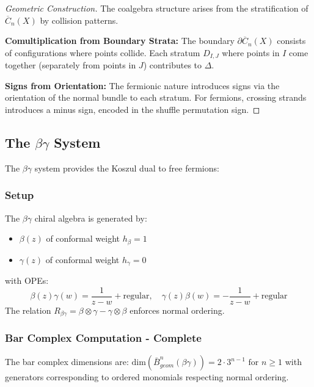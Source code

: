 \begin{proof}[Geometric Construction]
The coalgebra structure arises from the stratification of $\overline{C}_n(X)$ by collision patterns.

\textbf{Comultiplication from Boundary Strata:} The boundary $\partial\overline{C}_n(X)$ consists of 
configurations where points collide. Each stratum $D_{I,J}$ where points in $I$ come together 
(separately from points in $J$) contributes to $\Delta$.

\textbf{Signs from Orientation:} The fermionic nature introduces signs via the orientation of 
the normal bundle to each stratum. For fermions, crossing strands introduces a minus sign, 
encoded in the shuffle permutation sign.
\end{proof}

\subsection{The $\beta\gamma$ System}
 
The $\beta\gamma$ system provides the Koszul dual to free fermions:
 
\subsubsection{Setup}
 
\begin{definition}
The $\beta\gamma$ chiral algebra is generated by:
\begin{itemize}
\item $\beta(z)$ of conformal weight $h_\beta = 1$
\item $\gamma(z)$ of conformal weight $h_\gamma = 0$
\end{itemize}
with OPEs:
\[
\beta(z)\gamma(w) = \frac{1}{z-w} + \text{regular}, \quad 
\gamma(z)\beta(w) = -\frac{1}{z-w} + \text{regular}
\]
The relation $R_{\beta\gamma} = \beta \otimes \gamma - \gamma \otimes \beta$ enforces normal ordering.
\end{definition}
 
\subsubsection{Bar Complex Computation - Complete}

\begin{theorem}
The bar complex dimensions are:
$\text{dim}(\bar{B}^n_{geom}(\beta\gamma)) = 2 \cdot 3^{n-1} \text{ for } n \geq 1$
with generators corresponding to ordered monomials respecting normal ordering.
\end{theorem}

